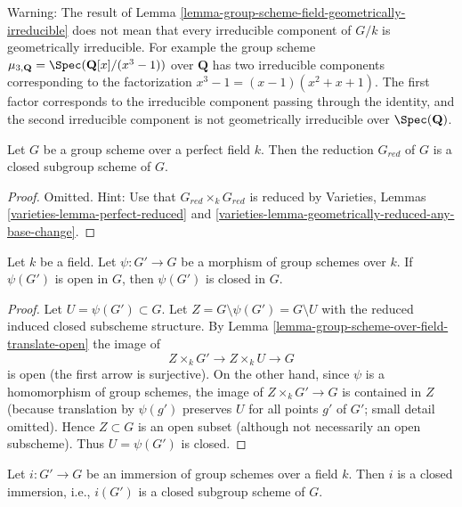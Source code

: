 \begin{remark}
\label{remark-warning-group-scheme-geometrically-irreducible}
Warning: The result of
Lemma \ref{lemma-group-scheme-field-geometrically-irreducible}
does not mean that every irreducible component of $G/k$ is
geometrically irreducible. For example the group scheme
$\mu_{3, \mathbf{Q}} = \Spec(\mathbf{Q}[x]/(x^3 - 1))$
over $\mathbf{Q}$ has two irreducible components corresponding
to the factorization $x^3 - 1 = (x - 1)(x^2 + x + 1)$.
The first factor corresponds to the irreducible component
passing through the identity, and the second irreducible component
is not geometrically irreducible over $\Spec(\mathbf{Q})$.
\end{remark}

\begin{lemma}
\label{lemma-reduced-subgroup-scheme-perfect}
Let $G$ be a group scheme over a perfect field $k$.
Then the reduction $G_{red}$ of $G$ is a closed subgroup scheme of $G$.
\end{lemma}

\begin{proof}
Omitted. Hint: Use that $G_{red} \times_k G_{red}$ is reduced by
Varieties, Lemmas \ref{varieties-lemma-perfect-reduced} and
\ref{varieties-lemma-geometrically-reduced-any-base-change}.
\end{proof}

\begin{lemma}
\label{lemma-open-subgroup-closed-over-field}
Let $k$ be a field. Let $\psi : G' \to G$ be a morphism of group schemes
over $k$. If $\psi(G')$ is open in $G$, then $\psi(G')$ is closed in $G$.
\end{lemma}

\begin{proof}
Let $U = \psi(G') \subset G$. Let $Z = G \setminus \psi(G') = G \setminus U$
with the reduced induced closed subscheme structure. By
Lemma \ref{lemma-group-scheme-over-field-translate-open}
the image of
$$
Z \times_k G' \longrightarrow
Z \times_k U \longrightarrow G
$$
is open (the first arrow is surjective). On the other hand, since $\psi$
is a homomorphism of group schemes, the image of $Z \times_k G' \to G$
is contained in $Z$ (because translation by $\psi(g')$ preserves
$U$ for all points $g'$ of $G'$; small detail omitted).
Hence $Z \subset G$ is an open subset (although not
necessarily an open subscheme). Thus $U = \psi(G')$ is closed.
\end{proof}

\begin{lemma}
\label{lemma-immersion-group-schemes-closed-over-field}
Let $i : G' \to G$ be an immersion of group schemes over a field $k$.
Then $i$ is a closed immersion, i.e., $i(G')$ is a closed subgroup scheme
of $G$.
\end{lemma}

